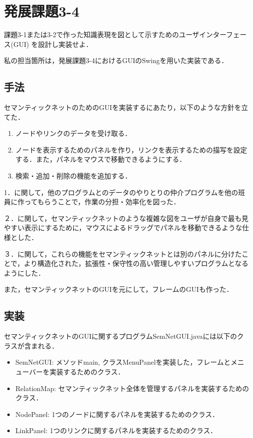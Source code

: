 \documentclass[12pt]{jarticle}
\begin{document}
\clearpage

\section{発展課題3-4}
\begin{screen}
課題3-1または3-2で作った知識表現を図として示すためのユーザインターフェース(GUI) を設計し実装せよ．
\end{screen}
私の担当箇所は，発展課題3-4におけるGUIのSwingを用いた実装である．

\subsection{手法}
セマンティックネットのためのGUIを実装するにあたり，以下のような方針を立てた．
\begin{enumerate}
\item ノードやリンクのデータを受け取る．
\item ノードを表示するためのパネルを作り，リンクを表示するための描写を設定する．また，パネルをマウスで移動できるようにする．
\item 検索・追加・削除の機能を追加する．
\end{enumerate}

1．に関して，他のプログラムとのデータのやりとりの仲介プログラムを他の班員に作ってもらうことで，作業の分担・効率化を図った．

２．に関して，セマンティックネットのような複雑な図をユーザが自身で最も見やすい表示にするために，マウスによるドラッグでパネルを移動できるような仕様とした．

３．に関して，これらの機能をセマンティックネットとは別のパネルに分けたことで，より構造化された，拡張性・保守性の高い管理しやすいプログラムとなるようにした．

また，セマンティックネットのGUIを元にして，フレームのGUIも作った．

\clearpage

\subsection{実装}
セマンティックネットのGUIに関するプログラムSemNetGUI.javaには以下のクラスが含まれる．
\begin{itemize}
\item SemNetGUI: メソッドmain, クラスMenuPanelを実装した，フレームとメニューバーを実装するためのクラス．
\item RelationMap: セマンティックネット全体を管理するパネルを実装するためのクラス．
\item NodePanel: 1つのノードに関するパネルを実装するためのクラス．
\item LinkPanel: 1つのリンクに関するパネルを実装するためのクラス．
\end{itemize}
\end{document}

